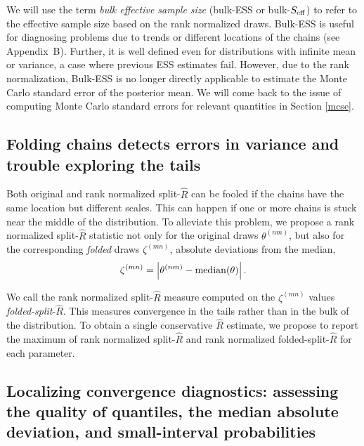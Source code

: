 \documentclass[american,]{article}
\theoremstyle{definition}
\begin{document}
We will use the term \emph{bulk effective sample size} (bulk-ESS or
bulk-\(S_{\rm eff}\)) to refer to the effective sample size based on the
rank normalized draws. Bulk-ESS is useful for diagnosing problems due to
trends or different locations of the chains (see Appendix~B). Further, it is
well defined even for distributions with infinite mean or variance, a
case where previous ESS estimates fail. However, due to the rank
normalization, Bulk-ESS is no longer directly applicable to estimate the
Monte Carlo standard error of the posterior mean. We will come back to
the issue of computing Monte Carlo standard errors for relevant
quantities in Section \ref{mcse}.

\hypertarget{diagnostics-for-folded-draws}{%
\subsection{Folding chains detects errors in variance and trouble exploring the tails}\label{diagnostics-for-folded-draws}}


Both original and rank normalized split-\(\widehat{R}\) can be
fooled if the chains have the same location but different scales. This
can happen if one or more chains is stuck near the middle of the distribution. 
To alleviate this problem, we propose a
rank normalized split-\(\widehat{R}\) statistic not only for the
original draws \(\theta^{(nm)}\), but also for the corresponding {\em folded}
draws \(\zeta^{(mn)}\), absolute deviations from the median,
\begin{equation}
\label{zeta}
\zeta^{(mn)} = \left|\theta^{(nm)}-{\rm median}(\theta)\right|.
\end{equation}

We call the rank normalized split-\(\widehat{R}\) measure computed on the
 \(\zeta^{(mn)}\) values  \emph{folded-split}-\(\widehat{R}\).
  This measures convergence in the
tails rather than in the bulk of the distribution. To obtain a single
conservative \(\widehat{R}\) estimate, we propose to report the maximum
of rank normalized split-\(\widehat{R}\) and rank normalized
folded-split-\(\widehat{R}\) for each parameter.

\hypertarget{convergence-diagnostics-for-quantiles}{%
\subsection{Localizing convergence diagnostics: assessing the quality of quantiles, the median absolute deviation, and small-interval probabilities }\label{convergence-diagnostics-for-quantiles}}
\end{document}
